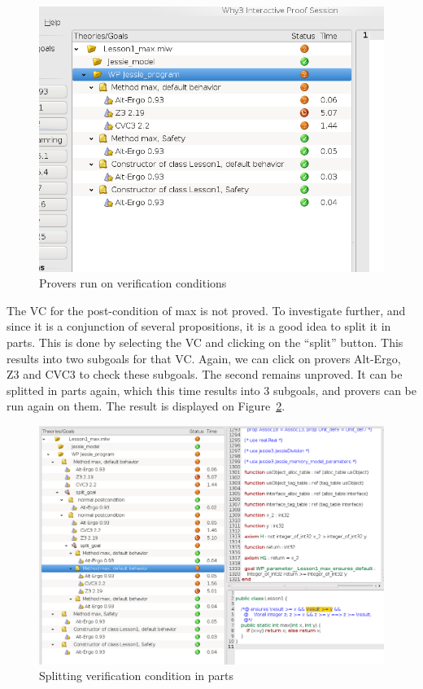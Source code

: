 \documentclass[a4paper,11pt,twoside,openright]{report}
\begin{document}
\begin{figure}[t]
  \begin{center}
    \includegraphics[width=1.0\textwidth]{Lesson1_max_why3_2.png}
  \end{center}
  \caption{Provers run on verification conditions}
\label{fig:why3b}
\hrulefill
\end{figure}

The VC for the post-condition of max is not proved. To investigate
further, and since it is a conjunction of several propositions, it is
a good idea to split it in parts. This is done by selecting the VC and
clicking on the ``split'' button. This results into two subgoals for
that VC. Again, we can click on provers Alt-Ergo, Z3 and CVC3 to check
these subgoals. The second remains unproved. It can be splitted in
parts again, which this time results into 3 subgoals, and provers can
be run again on them. The result is displayed on
Figure~\ref{fig:why3c}.

\clearpage

\begin{figure}[tp]
  \begin{center}
    \hspace*{-0.1\textwidth}
    \includegraphics[width=1.2\textwidth]{Lesson1_max_why3_3.png}
  \end{center}
  \caption{Splitting verification condition in parts}
\label{fig:why3c}
\hrulefill
\end{figure}
\end{document}
